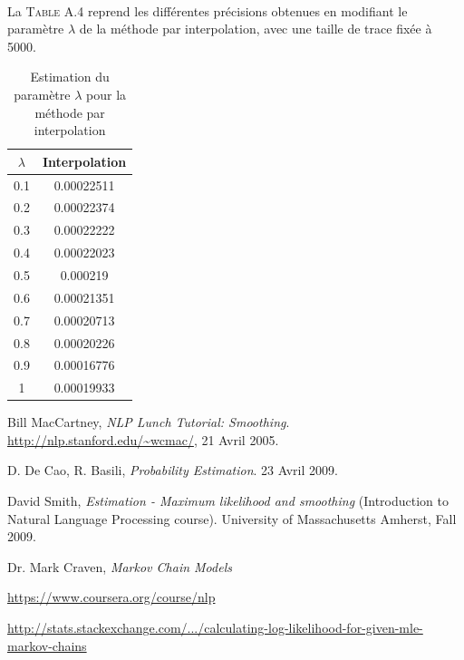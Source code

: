 \documentclass[a4paper,titlepage]{report}
\begin{document}
\paragraph{}
La \textsc{Table A.4} reprend les différentes précisions obtenues en modifiant le paramètre $\lambda$ de la méthode par interpolation, avec une taille de trace fixée à 5000.

\begin{table}[h]
	\center
	\begin{tabular}{c|c}
		$\lambda$ & Interpolation\\
		\hline
		0.1 & \num{0.00022511}\\
		0.2 & \num{0.00022374}\\
		0.3 & \num{0.00022222}\\
		0.4 & \num{0.00022023}\\
		0.5 & \num{0.000219}\\
		0.6 & \num{0.00021351}\\
		0.7 & \num{0.00020713}\\
		0.8 & \num{0.00020226}\\
		0.9 & \num{0.00016776}\\
		1 & \num{0.00019933}
	\end{tabular}
	\caption{Estimation du paramètre $\lambda$ pour la méthode par interpolation}
\end{table}

\begin{thebibliography}{9}

  Bill MacCartney,
  \emph{NLP Lunch Tutorial: Smoothing}.
  \url{http://nlp.stanford.edu/~wcmac/},
  21 Avril 2005.

  D. De Cao, R. Basili,
  \emph{Probability Estimation}.
  23 Avril 2009.

  David Smith,
  \emph{Estimation - Maximum likelihood and smoothing} (Introduction to Natural Language Processing course). University of Massachusetts Amherst,
  Fall 2009.

  Dr. Mark Craven,
  \emph{Markov Chain Models}

 \url{https://www.coursera.org/course/nlp}

  \href{http://stats.stackexchange.com/questions/47685/calculating-log-likelihood-for-given-mle-markov-chains}{http://stats.stackexchange.com/.../calculating-log-likelihood-for-given-mle-markov-chains}
\end{thebibliography}
\end{document}

